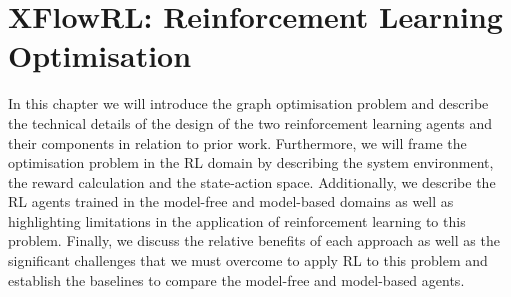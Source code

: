 \chapter{XFlowRL: Reinforcement Learning Optimisation}
In this chapter we will introduce the graph optimisation problem and describe the technical details of the design of the two reinforcement learning agents and their components in relation to prior work. Furthermore, we will frame the optimisation problem in the RL domain by describing the system environment, the reward calculation and the state-action space. Additionally, we describe the RL agents trained in the model-free and model-based domains as well as highlighting limitations in the application of reinforcement learning to this problem. Finally, we discuss the relative benefits of each approach as well as the significant challenges that we must overcome to apply RL to this problem and establish the baselines to compare the model-free and model-based agents.






